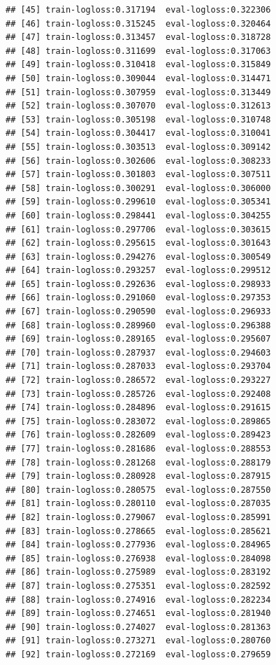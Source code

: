 \documentclass[
]{article}
\begin{document}
\begin{verbatim}
## [45] train-logloss:0.317194  eval-logloss:0.322306 
## [46] train-logloss:0.315245  eval-logloss:0.320464 
## [47] train-logloss:0.313457  eval-logloss:0.318728 
## [48] train-logloss:0.311699  eval-logloss:0.317063 
## [49] train-logloss:0.310418  eval-logloss:0.315849 
## [50] train-logloss:0.309044  eval-logloss:0.314471 
## [51] train-logloss:0.307959  eval-logloss:0.313449 
## [52] train-logloss:0.307070  eval-logloss:0.312613 
## [53] train-logloss:0.305198  eval-logloss:0.310748 
## [54] train-logloss:0.304417  eval-logloss:0.310041 
## [55] train-logloss:0.303513  eval-logloss:0.309142 
## [56] train-logloss:0.302606  eval-logloss:0.308233 
## [57] train-logloss:0.301803  eval-logloss:0.307511 
## [58] train-logloss:0.300291  eval-logloss:0.306000 
## [59] train-logloss:0.299610  eval-logloss:0.305341 
## [60] train-logloss:0.298441  eval-logloss:0.304255 
## [61] train-logloss:0.297706  eval-logloss:0.303615 
## [62] train-logloss:0.295615  eval-logloss:0.301643 
## [63] train-logloss:0.294276  eval-logloss:0.300549 
## [64] train-logloss:0.293257  eval-logloss:0.299512 
## [65] train-logloss:0.292636  eval-logloss:0.298933 
## [66] train-logloss:0.291060  eval-logloss:0.297353 
## [67] train-logloss:0.290590  eval-logloss:0.296933 
## [68] train-logloss:0.289960  eval-logloss:0.296388 
## [69] train-logloss:0.289165  eval-logloss:0.295607 
## [70] train-logloss:0.287937  eval-logloss:0.294603 
## [71] train-logloss:0.287033  eval-logloss:0.293704 
## [72] train-logloss:0.286572  eval-logloss:0.293227 
## [73] train-logloss:0.285726  eval-logloss:0.292408 
## [74] train-logloss:0.284896  eval-logloss:0.291615 
## [75] train-logloss:0.283072  eval-logloss:0.289865 
## [76] train-logloss:0.282609  eval-logloss:0.289423 
## [77] train-logloss:0.281686  eval-logloss:0.288553 
## [78] train-logloss:0.281268  eval-logloss:0.288179 
## [79] train-logloss:0.280928  eval-logloss:0.287915 
## [80] train-logloss:0.280575  eval-logloss:0.287550 
## [81] train-logloss:0.280110  eval-logloss:0.287035 
## [82] train-logloss:0.279067  eval-logloss:0.285991 
## [83] train-logloss:0.278665  eval-logloss:0.285621 
## [84] train-logloss:0.277936  eval-logloss:0.284965 
## [85] train-logloss:0.276938  eval-logloss:0.284098 
## [86] train-logloss:0.275989  eval-logloss:0.283192 
## [87] train-logloss:0.275351  eval-logloss:0.282592 
## [88] train-logloss:0.274916  eval-logloss:0.282234 
## [89] train-logloss:0.274651  eval-logloss:0.281940 
## [90] train-logloss:0.274027  eval-logloss:0.281363 
## [91] train-logloss:0.273271  eval-logloss:0.280760 
## [92] train-logloss:0.272169  eval-logloss:0.279659 

\end{verbatim}
\end{document}
